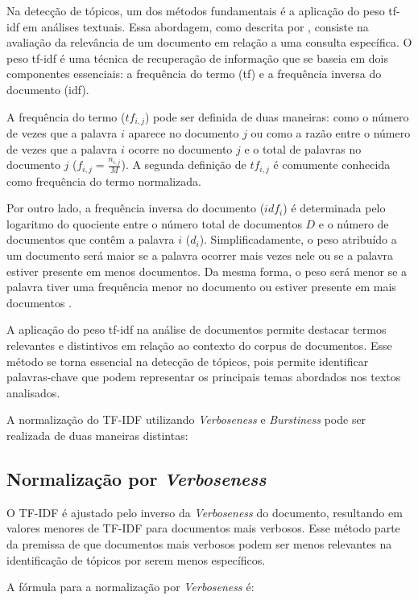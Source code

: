 \documentclass[runningheads]{llncs}
\begin{document}
Na detecção de tópicos, um dos métodos fundamentais é a aplicação do peso tf-idf em análises textuais. Essa abordagem, como descrita por \cite{Benhardus2013}, consiste na avaliação da relevância de um documento em relação a uma consulta específica. O peso tf-idf é uma técnica de recuperação de informação que se baseia em dois componentes essenciais: a frequência do termo (tf) e a frequência inversa do documento (idf).

A frequência do termo ($tf_{i,j}$) pode ser definida de duas maneiras: como o número de vezes que a palavra $i$ aparece no documento $j$ ou como a razão entre o número de vezes que a palavra $i$ ocorre no documento $j$ e o total de palavras no documento $j$ ($f_{i,j} = \frac{n_{i,j}}{M}$). A segunda definição de $tf_{i,j}$ é comumente conhecida como frequência do termo normalizada.

Por outro lado, a frequência inversa do documento ($idf_i$) é determinada pelo logaritmo do quociente entre o número total de documentos $D$ e o número de documentos que contêm a palavra $i$ ($d_i$). Simplificadamente, o peso atribuído a um documento será maior se a palavra ocorrer mais vezes nele ou se a palavra estiver presente em menos documentos. Da mesma forma, o peso será menor se a palavra tiver uma frequência menor no documento ou estiver presente em mais documentos \cite{Hiemstra2000}.

A aplicação do peso tf-idf na análise de documentos permite destacar termos relevantes e distintivos em relação ao contexto do corpus de documentos. Esse método se torna essencial na detecção de tópicos, pois permite identificar palavras-chave que podem representar os principais temas abordados nos textos analisados.

A normalização do TF-IDF utilizando \textit{Verboseness} e \textit{Burstiness} pode ser realizada de duas maneiras distintas:

\subsection{Normalização por \textit{Verboseness}}

O TF-IDF é ajustado pelo inverso da \textit{Verboseness} do documento, resultando em valores menores de TF-IDF para documentos mais verbosos. Esse método parte da premissa de que documentos mais verbosos podem ser menos relevantes na identificação de tópicos por serem menos específicos.

A fórmula para a normalização por \textit{Verboseness} é:
\end{document}
